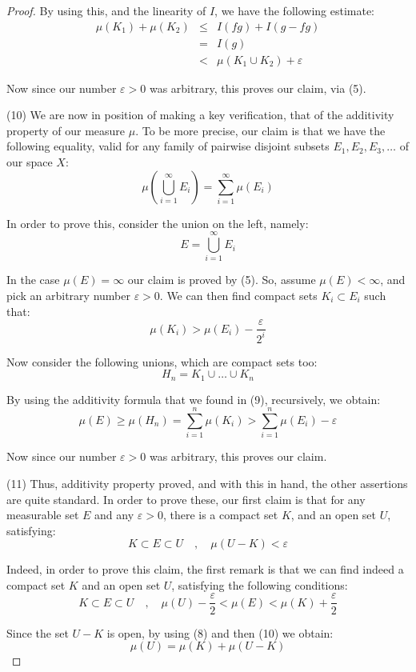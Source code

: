 \documentclass[12pt]{amsbook}
\begin{document}
\begin{proof}
By using this, and the linearity of $I$, we have the following estimate:
\begin{eqnarray*}
\mu(K_1)+\mu(K_2)
&\leq&I(fg)+I(g-fg)\\
&=&I(g)\\
&<&\mu(K_1\cup K_2)+\varepsilon
\end{eqnarray*}

Now since our number $\varepsilon>0$ was arbitrary, this proves our claim, via (5).

\medskip

(10) We are now in position of making a key verification, that of the additivity property of our measure $\mu$. To be more precise, our claim is that we have the following equality, valid for any family of pairwise disjoint subsets $E_1,E_2,E_3,\ldots$ of our space $X$:
$$\mu\left(\bigcup_{i=1}^\infty E_i\right)=\sum_{i=1}^\infty\mu(E_i)$$

In order to prove this, consider the union on the left, namely:
$$E=\bigcup_{i=1}^\infty E_i$$

In the case $\mu(E)=\infty$ our claim is proved by (5). So, assume $\mu(E)<\infty$, and pick an arbitrary number $\varepsilon>0$. We can then find compact sets $K_i\subset E_i$ such that:
$$\mu(K_i)>\mu(E_i)-\frac{\varepsilon}{2^i}$$

Now consider the following unions, which are compact sets too:
$$H_n=K_1\cup\ldots\cup K_n$$

By using the additivity formula that we found in (9), recursively, we obtain:
$$\mu(E)
\geq\mu(H_n)
=\sum_{i=1}^n\mu(K_i)
>\sum_{i=1}^n\mu(E_i)-\varepsilon$$

Now since our number $\varepsilon>0$ was arbitrary, this proves our claim.

\medskip

(11) Thus, additivity property proved, and with this in hand, the other assertions are quite standard. In order to prove these, our first claim is that for any measurable set $E$ and any $\varepsilon>0$, there is a compact set $K$, and an open set $U$, satisfying:
$$K\subset E\subset U\quad,\quad \mu(U-K)<\varepsilon$$

Indeed, in order to prove this claim, the first remark is that we can find indeed a compact set $K$ and an open set $U$, satisfying the following conditions:
$$K\subset E\subset U\quad,\quad \mu(U)-\frac{\varepsilon}{2}<\mu(E)<\mu(K)+\frac{\varepsilon}{2}$$

Since the set $U-K$ is open, by using (8) and then (10) we obtain:
$$\mu(U)=\mu(K)+\mu(U-K)$$


\end{proof}
\end{document}
